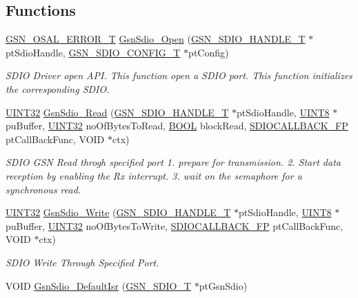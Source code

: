 \subsection*{Functions}
\begin{DoxyCompactItemize}
\item 
\hyperlink{a00659_ga36216a7aacd1d5024bc7b8bf39c3f46b}{GSN\_\-OSAL\_\-ERROR\_\-T} \hyperlink{a00653_ga8759149a411f2bab32619807abc882b6}{GsnSdio\_\-Open} (\hyperlink{a00224}{GSN\_\-SDIO\_\-HANDLE\_\-T} $\ast$ptSdioHandle, \hyperlink{a00226}{GSN\_\-SDIO\_\-CONFIG\_\-T} $\ast$ptConfig)
\begin{DoxyCompactList}\small\item\em SDIO Driver open API. This function open a SDIO port. This function initializes the corresponding SDIO. \end{DoxyCompactList}\item 
\hyperlink{a00660_gae1e6edbbc26d6fbc71a90190d0266018}{UINT32} \hyperlink{a00653_gaef9addfeef70518b7326d2cb8d7fe435}{GsnSdio\_\-Read} (\hyperlink{a00224}{GSN\_\-SDIO\_\-HANDLE\_\-T} $\ast$ptSdioHandle, \hyperlink{a00660_gab27e9918b538ce9d8ca692479b375b6a}{UINT8} $\ast$puBuffer, \hyperlink{a00660_gae1e6edbbc26d6fbc71a90190d0266018}{UINT32} noOfBytesToRead, \hyperlink{a00660_ga1f04022c0a182c51c059438790ea138c}{BOOL} blockRead, \hyperlink{a00584_ac80005f1e9ff1e1e884583938336474b}{SDIOCALLBACK\_\-FP} ptCallBackFunc, VOID $\ast$ctx)
\begin{DoxyCompactList}\small\item\em SDIO GSN Read throgh specified port 1. prepare for transmission. 2. Start data reception by enabling the Rx interrupt. 3. wait on the semaphore for a synchronous read. \end{DoxyCompactList}\item 
\hyperlink{a00660_gae1e6edbbc26d6fbc71a90190d0266018}{UINT32} \hyperlink{a00653_ga1f7657660110943adae4d9ca818afbb5}{GsnSdio\_\-Write} (\hyperlink{a00224}{GSN\_\-SDIO\_\-HANDLE\_\-T} $\ast$ptSdioHandle, \hyperlink{a00660_gab27e9918b538ce9d8ca692479b375b6a}{UINT8} $\ast$puBuffer, \hyperlink{a00660_gae1e6edbbc26d6fbc71a90190d0266018}{UINT32} noOfBytesToWrite, \hyperlink{a00584_ac80005f1e9ff1e1e884583938336474b}{SDIOCALLBACK\_\-FP} ptCallBackFunc, VOID $\ast$ctx)
\begin{DoxyCompactList}\small\item\em SDIO Write Through Specified Port. \end{DoxyCompactList}\item 
VOID \hyperlink{a00653_ga2e2284223c578c2adc1675b6aad5d1f3}{GsnSdio\_\-DefaultIsr} (\hyperlink{a00216}{GSN\_\-SDIO\_\-T} $\ast$ptGsnSdio)

\end{DoxyCompactItemize}
